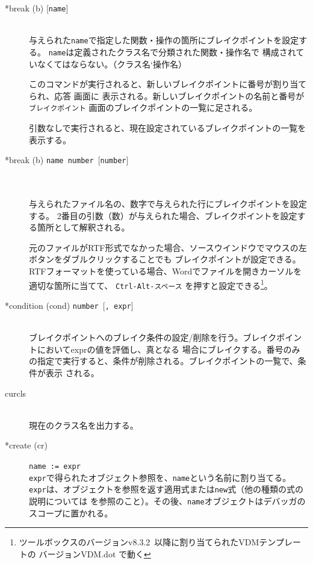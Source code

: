 \documentclass[\pformat,12pt]{jarticle}
\newcommand{\vdmtoolsver}{v8.3.2}
\newcommand{\guicmd}[1]{{\gt #1}}
\begin{document}
\begin{description}


\item[*break (b) \mbox{[{\tt name}]}] 
\mbox{}\\
  与えられた{\tt name}で指定した関数・操作の箇所にブレイクポイントを設定する。
%
{%
{\tt name}は定義されたクラス名で分類された関数・操作名で
構成されていなくてはならない。（クラス名`操作名）
}%
{%
}

  このコマンドが実行されると、新しいブレイクポイントに番号が割り当てられ、\guicmd{応答} 画面に
  表示される。新しいブレイクポイントの名前と番号が \texttt{ブレイクポイント} 画面のブレイクポイントの一覧に足される。

  引数なしで実行されると、現在設定されているブレイクポイントの一覧を表示する。

\item[*break (b) \mbox{\texttt{name number} [\texttt{number}]}]\mbox{}\\
\mbox{}\\
 与えられたファイル名の、数字で与えられた行にブレイクポイントを設定する。
 2番目の引数（数）が与えられた場合、ブレイクポイントを設定する箇所として解釈される。

元のファイルがRTF形式でなかった場合、\guicmd{ソースウインドウ}でマウスの左ボタンをダブルクリックすることでも
ブレイクポイントが設定できる。
RTFフォーマットを使っている場合、Wordでファイルを開きカーソルを適切な箇所に当てて、
\texttt{Ctrl-Alt-スペース}%
を押すと設定できる\footnote{ツールボックスのバージョン\vdmtoolsver\ 以降に割り当てられたVDMテンプレートの
バージョンVDM.dot で動く}。 

\item[*condition (cond) \mbox{\texttt{number} [\texttt{, expr}]}]\mbox{}\\
  ブレイクポイントへのブレイク条件の設定/削除を行う。ブレイクポイントにおいてexprの値を評価し、真となる
  場合にブレイクする。番号のみの指定で実行すると、条件が削除される。ブレイクポイントの一覧で、条件が表示
  される。


\item[curcls] \mbox{}\\
  現在のクラス名を出力する。

\item[*create (cr)] {\tt name := expr}\mbox{}\\
  {\tt expr}で得られたオブジェクト参照を、{\tt name}という名前に割り当てる。
  {\tt expr}は、オブジェクトを参照を返す適用式または{\tt new}式（他の種類の式の説明については
  \cite{LangManPP-SCSK}を参照のこと）。その後、{\tt name}オブジェクトはデバッガのスコープに置かれる。
  

\end{description}
\end{document}
